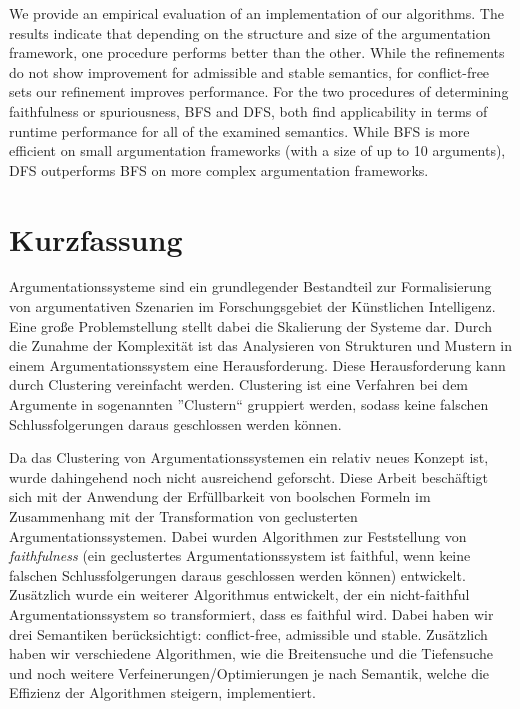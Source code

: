 \documentclass[twoside,openright]{scrreprt}
\begin{document}
We provide an empirical evaluation of an implementation of our algorithms. The results indicate that depending on the structure and size of the argumentation framework, one procedure performs better than the other. While the refinements do not show improvement for admissible and stable semantics, for conflict-free sets our refinement improves performance. For the two procedures of determining faithfulness or spuriousness, BFS and DFS, both find applicability in terms of runtime performance for all of the examined semantics. While BFS is more efficient on small argumentation frameworks (with a size of up to 10 arguments), DFS outperforms BFS on more complex argumentation frameworks.





\chapter*{Kurzfassung}

Argumentationssysteme sind ein grundlegender Bestandteil zur Formalisierung von argumentativen Szenarien im Forschungsgebiet der Künstlichen Intelligenz. Eine große Problemstellung stellt dabei die Skalierung der Systeme dar. Durch die Zunahme der Komplexität ist das Analysieren von Strukturen und Mustern in einem Argumentationssystem eine Herausforderung. Diese Herausforderung kann durch Clustering vereinfacht werden. Clustering ist eine Verfahren bei dem Argumente in sogenannten ''Clustern`` gruppiert werden, sodass keine falschen Schlussfolgerungen daraus geschlossen werden können.

Da das Clustering von Argumentationssystemen ein relativ neues Konzept ist, wurde dahingehend noch nicht ausreichend geforscht. Diese Arbeit beschäftigt sich mit der Anwendung der Erfüllbarkeit von boolschen Formeln im Zusammenhang mit der Transformation von geclusterten Argumentationssystemen. Dabei wurden Algorithmen zur Feststellung von \emph{faithfulness} (ein geclustertes Argumentationssystem ist faithful, wenn keine falschen Schlussfolgerungen daraus geschlossen werden können) entwickelt. Zusätzlich wurde ein weiterer Algorithmus entwickelt, der ein nicht-faithful Argumentationssystem so transformiert, dass es faithful wird. Dabei haben wir drei Semantiken berücksichtigt: conflict-free, admissible und stable. Zusätzlich haben wir verschiedene Algorithmen, wie die Breitensuche und die Tiefensuche und noch weitere Verfeinerungen/Optimierungen je nach Semantik, welche die Effizienz der Algorithmen steigern, implementiert.
\end{document}
